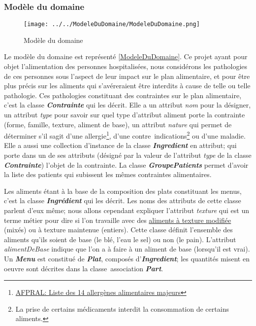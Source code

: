 \subsubsection{Modèle du domaine}
\begin{figure}
  \centering
      \texttt{[image: ../../ModeleDuDomaine/ModeleDuDomaine.png]} %
\caption{Modèle du domaine}
\label{ModeleDuDomaine}
\end{figure}

\newcommand{\classe}[1]{\emph{\textbf{#1}}}
\newcommand{\attribut}[1]{\emph{#1}}
\newcommand{\regleD}[1]{\textcolor{NavyBlue}{#1}}
\newcommand{\regleT}[1]{\textcolor{ForestGreen}{#1}}

Le modèle du domaine est représenté \autoref{ModeleDuDomaine}. Ce projet ayant pour objet l'alimentation des personnes hospitalisées, nous considérons les pathologies de ces personnes sous l'aspect de leur impact sur le plan alimentaire, et pour être plus précis sur les aliments qui s'avéreraient être interdits à cause de telle ou telle pathologie. Ces pathologies constituant des contraintes sur le plan alimentaire, c'est la classe \classe{Contrainte} qui les décrit. Elle a un attribut \attribut{nom} pour la désigner, un attribut \attribut{type} pour savoir sur quel type d'attribut aliment porte la contrainte (forme, famille, texture, aliment de base), un attribut \attribut{nature} qui permet de déterminer s'il sagit d'une allergie\footnote{\label{allergies}\href{https://allergies.afpral.fr/allergie/en-savoir-plus-sur-les-allergies/alimentaires/89-liste-des-14-allergenes-alimentaires-majeurs}{AFPRAL: Liste des 14 allergènes alimentaires majeurs}}, d'une contre~indications\footnote{\label{contreIndications}La prise de certains médicaments interdit la consommation de certains aliments.} ou d'une maladie. Elle a aussi une collection d'instance de la classe \classe{Ingredient} en attribut; qui porte dans un de ses attributs (désigné par la valeur de l'attribut \attribut{type} de la classe \classe{Contrainte}) l'objet de la contrainte. La classe \classe{GroupePatients} permet d'avoir la liste des patients qui subissent les mêmes contraintes alimentaires.

Les aliments étant à la base de la composition des plats constituant les menus, c'est la classe \classe{Ingrédient} qui les décrit. Les noms des attributs de cette classe parlent d'eux même; nous allons cependant expliquer l'attribut \attribut{texture} qui est un terme métier pour dire si l'on travaille avec des \href{http://plone.vermeil.org:8080/ehpad/Bibliotheque/Memoires/annee-2012-2013/07 - Les textures modifiees et le plaisir de manger de Jacques Caby.pdf}{aliments à texture modifiée} (mixés) ou à texture maintenue (entiers). Cette classe définit l'ensemble des aliments qu'ils soient de base (le blé, l'eau le sel) ou non (le pain). L'attribut \attribut{alimentDeBase} indique que l'on a à faire à un aliment de base (lorsqu'il est vrai). Un \classe{Menu} est constitué de \classe{Plat}, composés d'\classe{Ingredient}; les quantités misent en oeuvre sont décrites dans la classe~association \classe{Part}.

